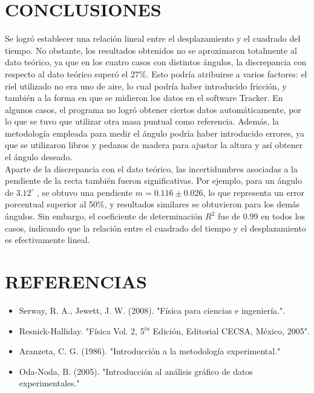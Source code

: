\documentclass[journal]{IEEEtran}
\begin{document}
\section{ CONCLUSIONES} 
Se logró establecer una relación lineal entre el desplazamiento y el cuadrado del tiempo. No obstante, los resultados obtenidos no se aproximaron totalmente al dato teórico, ya que en los cuatro casos con distintos ángulos, la discrepancia con respecto al dato teórico superó el 27\%. Esto podría atribuirse a varios factores: el riel utilizado no era uno de aire, lo cual podría haber introducido fricción, y también a la forma en que se midieron los datos en el software Tracker. En algunos casos, el programa no logró obtener ciertos datos automáticamente, por lo que se tuvo que utilizar otra masa puntual como referencia. Además, la metodología empleada para medir el ángulo podría haber introducido errores, ya que se utilizaron libros y pedazos de madera para ajustar la altura y así obtener el ángulo deseado. \\
Aparte de la discrepancia con el dato teórico, las incertidumbres asociadas a la pendiente de la recta también fueron significativas. Por ejemplo, para un ángulo de $3.12^{\circ}$ , se obtuvo una pendiente $m = 0.116 \pm 0.026$, lo que representa un error porcentual superior al 50\%, y resultados similares se obtuvieron para los demás ángulos. Sin embargo, el coeficiente de determinación $R^2$ fue de 0.99 en todos los casos, indicando que la relación entre el cuadrado del tiempo y el desplazamiento es efectivamente lineal.


\section{ REFERENCIAS}
\begin{itemize}
\item Serway, R. A., Jewett, J. W. (2008). "Física para ciencias e ingeniería.".
\item Resnick-Halliday. "Física Vol. 2, 5$^{ta}$ Edición, Editorial CECSA, México, 2005".
\item Aranzeta, C. G. (1986). "Introducción a la metodología experimental."
\item Oda-Noda, B. (2005). "Introducción al análisis gráfico de datos experimentales." 
\end{itemize}
\end{document}
